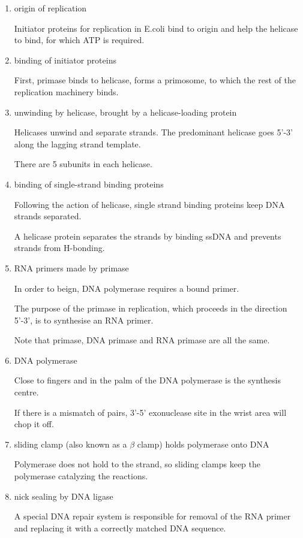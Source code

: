 \documentclass[11pt]{scrartcl}
\begin{document}
\begin{enumerate}
\item\label{item:3} origin of replication

  Initiator proteins for replication in E.coli bind to origin and help
  the helicase to bind, for which ATP is required.

\item binding of initiator proteins

  First, primase binds
  to helicase, forms a primosome, to which the rest of the replication
  machinery binds.

\item unwinding by helicase, brought by a helicase-loading protein

  Helicases unwind and separate strands. The predominant helicase goes
  5'-3' along the lagging strand template.

  There are 5 subunits in each helicase.

\item binding of single-strand binding proteins

  Following the action of helicase, single strand binding proteins
  keep DNA strands separated.

  A helicase protein separates the strands by binding ssDNA and
  prevents strands from H-bonding.

\item RNA primers made by primase

  In order to beign, DNA polymerase requires a bound primer.

  The purpose of the primase in replication, which proceeds in the
  direction 5'-3', is to synthesise an RNA primer.

  Note that primase, DNA primase and RNA primase are all the same.

\item DNA polymerase

  Close to fingers and in the palm of the DNA polymerase is the
  synthesis centre.

  If there is a mismatch of pairs, 3'-5' exonuclease site in the wrist
  area will chop it off.

\item sliding clamp (also known as a $\beta$ clamp) holds polymerase
  onto DNA

  Polymerase does not hold to the strand, so sliding clamps keep the
  polymerase catalyzing the reactions.

\item nick sealing by DNA ligase


  A special DNA repair system is responsible for removal of the RNA
  primer and replacing it with a correctly matched DNA sequence.



\end{enumerate}
\end{document}
